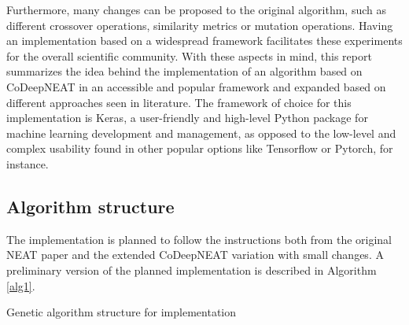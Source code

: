 \documentclass[12pt]{article}
\begin{document}
\begin{comment}
Although algorithms like NEAT and its variations have existing implementations directly from its authors, they consist of self-contained code that can be expanded but presents barriers in terms of directly connecting to other popular Machine Learning frameworks that researchers, students or scientists are more likely to be familiar with. Frameworks like Keras[ref], Tensorflow[ref], PyTorch[ref] or Caffe[ref] contain a number of functionalities that may come in handy when developing or analyzing machine learning models, which is a key element in validating the resulting models from neural architecture search algorithms in practice. As of the moment of this review, few or lacking implementations using these frameworks were found, presenting an opportunity to bring these methods to a more accessible context.
\end{comment}

Furthermore, many changes can be proposed to the original algorithm, such as different crossover operations, similarity metrics or mutation operations. Having an implementation based on a widespread framework facilitates these experiments for the overall scientific community. With these aspects in mind, this report summarizes the idea behind the implementation of an algorithm based on CoDeepNEAT in an accessible and popular framework and expanded based on different approaches seen in literature. The framework of choice for this implementation is Keras, a user-friendly and high-level Python package for machine learning development and management, as opposed to the low-level and complex usability found in other popular options like Tensorflow or Pytorch, for instance.

\subsection{Algorithm structure}

The implementation is planned to follow the instructions both from the original NEAT paper and the extended CoDeepNEAT variation with small changes. A preliminary version of the planned implementation is described in Algorithm \ref{alg1}.

\begin{algorithm}[ht]
\caption{Genetic algorithm structure for implementation\label{IR}}
\SetAlgoLined
{}
 \label{alg1}
\end{algorithm}
\end{document}

